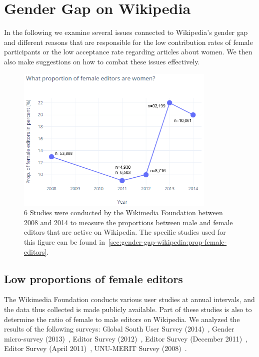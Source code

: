 \documentclass[a4paper, 11pt]{article}
\begin{document}
\section{Gender Gap on Wikipedia} \label{sec:gender-gap-wikipedia}
In the following we examine several issues connected to Wikipedia’s gender gap and different reasons that are responsible for the low contribution rates of female participants or the low acceptance rate regarding articles about women. We then also make suggestions on how to combat these issues effectively.

\begin{figure}[t]
	\centering
	\includegraphics[width=0.85\textwidth]{figures/PropFemaleEditors.png}
\caption{6 Studies were conducted by the Wikimedia Foundation between 2008 and 2014 to measure the proportions between male and female editors that are active on Wikipedia. The specific studies used for this figure can be found in~\autoref{sec:gender-gap-wikipedia:prop-female-editors}.} \label{fig:PropFemaleEditors}
\end{figure}

\subsection{Low proportions of female editors} \label{sec:gender-gap-wikipedia:prop-female-editors}
The Wikimedia Foundation conducts various user studies at annual intervals, and the data thus collected is made publicly available. Part of these studies is also to determine the ratio of female to male editors on Wikipedia. We analyzed the results of the following surveys: Global South User Survey (2014)~\cite{shammaa2014}, Gender micro-survey (2013)~\cite{fung2013}, Editor Survey (2012)~\cite{tilman2012}, Editor Survey (December 2011)~\cite{pande2011}, Editor Survey (April 2011)~\cite{khanna2011}, UNU-MERIT Survey (2008)~\cite{glott2010wikipedia}.
\end{document}
